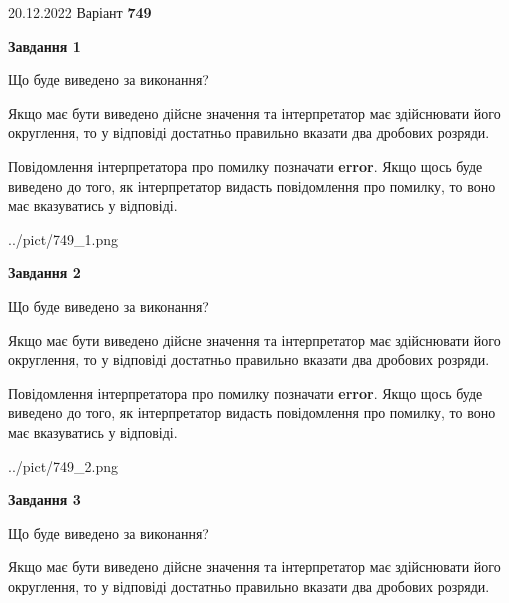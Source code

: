 \documentclass[12pt, ukrainian]{article}
\begin{document}
{20.12.2022 Варіант \No \textbf { 749 }\par}
{
\begin {Large}

{\begin {center}\textbf{Завдання 1}\end {center}}\par
Що буде виведено за виконання? \par

Якщо має бути виведено дійсне значення та інтерпретатор має здійснювати його округлення, 
то у відповіді достатньо правильно вказати два дробових розряди.

Повідомлення інтерпретатора про помилку позначати \textbf{error}.
Якщо щось буде виведено до того, як інтерпретатор видасть повідомлення про помилку, 
то воно має вказуватись у відповіді. \par

\begin{center}
	{../pict/749_1.png}
\end{center}
\newpage

{\begin {center}\textbf{Завдання 2}\end {center}}\par
Що буде виведено за виконання? \par

Якщо має бути виведено дійсне значення та інтерпретатор має здійснювати його округлення, 
то у відповіді достатньо правильно вказати два дробових розряди.

Повідомлення інтерпретатора про помилку позначати \textbf{error}.
Якщо щось буде виведено до того, як інтерпретатор видасть повідомлення про помилку, 
то воно має вказуватись у відповіді. \par

\begin{center}
	{../pict/749_2.png}
\end{center}
\newpage

{\begin {center}\textbf{Завдання 3}\end {center}}\par
Що буде виведено за виконання? \par

Якщо має бути виведено дійсне значення та інтерпретатор має здійснювати його округлення, 
то у відповіді достатньо правильно вказати два дробових розряди.


\end{Large}}
\end{document}
